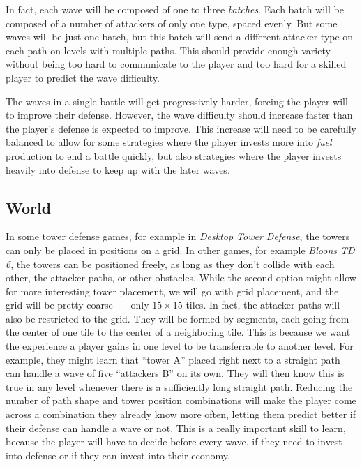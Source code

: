 In fact, each wave will be composed of one to three \emph{batches}.
Each batch will be composed of a number of attackers of only one type, spaced evenly.
But some waves will be just one batch, but this batch will send a different attacker type on each path on levels with multiple paths.
This should provide enough variety without being too hard to communicate to the player and too hard for a skilled player to predict the wave difficulty.

The waves in a single battle will get progressively harder, forcing the player will to improve their defense.
However, the wave difficulty should increase faster than the player's defense is expected to improve.
This increase will need to be carefully balanced to allow for some strategies where the player invests more into \emph{fuel} production to end a battle quickly, but also strategies where the player invests heavily into defense to keep up with the later waves.

\subsection{World}\label{sec:design-world}

In some tower defense games, for example in \emph{Desktop Tower Defense}, the towers can only be placed in positions on a grid.
In other games, for example \emph{Bloons TD 6}, the towers can be positioned freely, as long as they don't collide with each other, the attacker paths, or other obstacles.
While the second option might allow for more interesting tower placement, we will go with grid placement, and the grid will be pretty coarse~--- only $15 \times 15$ tiles.
In fact, the attacker paths will also be restricted to the grid.
They will be formed by segments, each going from the center of one tile to the center of a neighboring tile.
This is because we want the experience a player gains in one level to be transferrable to another level.
For example, they might learn that \enquote{tower A} placed right next to a straight path can handle a wave of five \enquote{attackers B} on its own.
They will then know this is true in any level whenever there is a sufficiently long straight path.
Reducing the number of path shape and tower position combinations will make the player come across a combination they already know more often, letting them predict better if their defense can handle a wave or not.
This is a really important skill to learn, because the player will have to decide before every wave, if they need to invest into defense or if they can invest into their economy.

